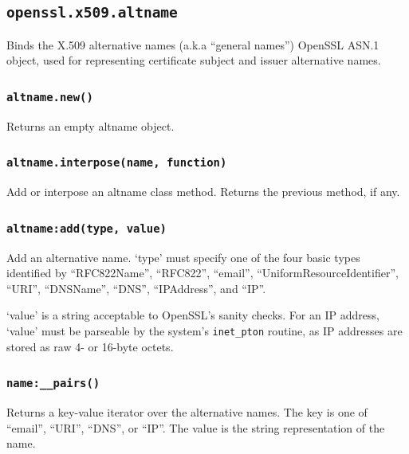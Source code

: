 \documentclass[11pt, oneside]{memoir}
\newcommand*{\fn}[1]{\texttt{#1}\xspace}
\newcounter{toccols}
\newenvironment{Module}[1]{
	\subsection{\texttt{#1}}
	\addtocontents{toc}{
		\protect\begin{multicols}{\value{toccols}}
	}
}{
	\addtocontents{toc}{\protect\end{multicols}}
}
\begin{document}
\begin{Module}{openssl.x509.altname}

Binds the X.509 alternative names (a.k.a ``general names'') OpenSSL ASN.1 object, used for representing certificate subject and issuer alternative names.

\subsubsection[\fn{altname.new}]{\fn{altname.new()}}

Returns an empty altname object.

\subsubsection[\fn{altname.interpose}]{\fn{altname.interpose(name, function)}}

Add or interpose an altname class method. Returns the previous method, if any.

\subsubsection[\fn{altname:add}]{\fn{altname:add(type, value)}}

Add an alternative name. `type' must specify one of the four basic types identified by ``RFC822Name'', ``RFC822'', ``email'', ``UniformResourceIdentifier'', ``URI'', ``DNSName'', ``DNS'', ``IPAddress'', and ``IP''.

`value' is a string acceptable to OpenSSL's sanity checks. For an IP address, `value' must be parseable by the system's \fn{inet\_pton} routine, as IP addresses are stored as raw 4- or 16-byte octets.

\subsubsection[\fn{name:\_\_pairs}]{\fn{name:\_\_pairs()}}

Returns a key-value iterator over the alternative names. The key is one of ``email'', ``URI'', ``DNS'', or ``IP''. The value is the string representation of the name.

\end{Module}
\end{document}
